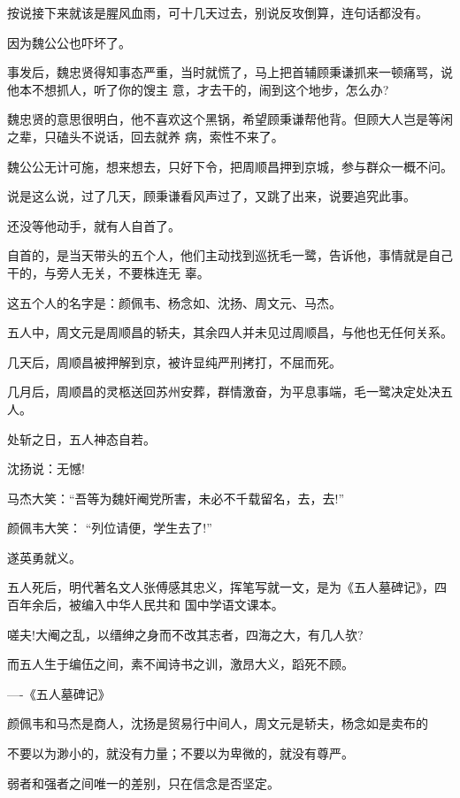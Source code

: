 \documentclass[11pt,a4paper,onecolumn]{article}
\begin{document}
按说接下来就该是腥风血雨，可十几天过去，别说反攻倒算，连句话都没有。

因为魏公公也吓坏了。

事发后，魏忠贤得知事态严重，当时就慌了，马上把首辅顾秉谦抓来一顿痛骂，说他本不想抓人，听了你的馊主
意，才去干的，闹到这个地步，怎么办?

魏忠贤的意思很明白，他不喜欢这个黑锅，希望顾秉谦帮他背。但顾大人岂是等闲之辈，只磕头不说话，回去就养
病，索性不来了。

魏公公无计可施，想来想去，只好下令，把周顺昌押到京城，参与群众一概不问。

说是这么说，过了几天，顾秉谦看风声过了，又跳了出来，说要追究此事。

还没等他动手，就有人自首了。

自首的，是当天带头的五个人，他们主动找到巡抚毛一鹭，告诉他，事情就是自己干的，与旁人无关，不要株连无
辜。

这五个人的名字是：颜佩韦、杨念如、沈扬、周文元、马杰。

五人中，周文元是周顺昌的轿夫，其余四人并未见过周顺昌，与他也无任何关系。

几天后，周顺昌被押解到京，被许显纯严刑拷打，不屈而死。

几月后，周顺昌的灵柩送回苏州安葬，群情激奋，为平息事端，毛一鹭决定处决五人。

处斩之日，五人神态自若。

沈扬说：无憾!

马杰大笑：``吾等为魏奸阉党所害，未必不千载留名，去，去!''

颜佩韦大笑： ``列位请便，学生去了!''

遂英勇就义。

五人死后，明代著名文人张傅感其忠义，挥笔写就一文，是为《五人墓碑记》，四百年余后，被编入中华人民共和
国中学语文课本。

嗟夫!大阉之乱，以缙绅之身而不改其志者，四海之大，有几人欤?

而五人生于编伍之间，素不闻诗书之训，激昂大义，蹈死不顾。

----《五人墓碑记》

颜佩韦和马杰是商人，沈扬是贸易行中间人，周文元是轿夫，杨念如是卖布的

不要以为渺小的，就没有力量；不要以为卑微的，就没有尊严。

弱者和强者之间唯一的差别，只在信念是否坚定。

\section[\thesection]{}
\end{document}
